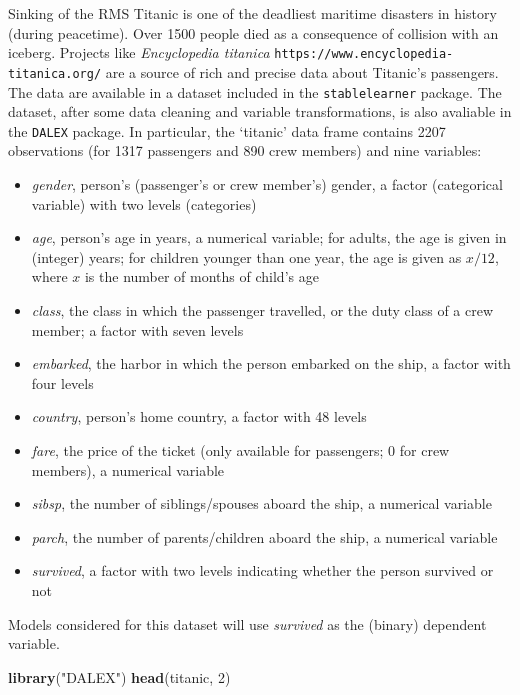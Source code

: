 \documentclass[12pt,]{krantz}
\newenvironment{Shaded}{\begin{snugshade}}{\end{snugshade}}
\newcommand{\DecValTok}[1]{\textcolor[rgb]{0.00,0.00,0.81}{#1}}
\newcommand{\KeywordTok}[1]{\textcolor[rgb]{0.13,0.29,0.53}{\textbf{#1}}}
\newcommand{\NormalTok}[1]{#1}
\newcommand{\StringTok}[1]{\textcolor[rgb]{0.31,0.60,0.02}{#1}}
\providecommand{\tightlist}{%
  \setlength{\itemsep}{0pt}\setlength{\parskip}{0pt}}
\theoremstyle{definition}
\theoremstyle{definition}
\theoremstyle{definition}
\theoremstyle{remark}
\begin{document}
Sinking of the RMS Titanic is one of the deadliest maritime disasters in
history (during peacetime). Over 1500 people died as a consequence of
collision with an iceberg. Projects like \emph{Encyclopedia titanica}
\texttt{https://www.encyclopedia-titanica.org/} are a source of rich and
precise data about Titanic's passengers. The data are available in a
dataset included in the \texttt{stablelearner} package. The dataset,
after some data cleaning and variable transformations, is also avaliable
in the \texttt{DALEX} package. In particular, the `titanic' data frame
contains 2207 observations (for 1317 passengers and 890 crew members)
and nine variables:

\begin{itemize}
\tightlist
\item
  \emph{gender}, person's (passenger's or crew member's) gender, a
  factor (categorical variable) with two levels (categories)
\item
  \emph{age}, person's age in years, a numerical variable; for adults,
  the age is given in (integer) years; for children younger than one
  year, the age is given as \(x/12\), where \(x\) is the number of
  months of child's age
\item
  \emph{class}, the class in which the passenger travelled, or the duty
  class of a crew member; a factor with seven levels
\item
  \emph{embarked}, the harbor in which the person embarked on the ship,
  a factor with four levels
\item
  \emph{country}, person's home country, a factor with 48 levels
\item
  \emph{fare}, the price of the ticket (only available for passengers; 0
  for crew members), a numerical variable
\item
  \emph{sibsp}, the number of siblings/spouses aboard the ship, a
  numerical variable
\item
  \emph{parch}, the number of parents/children aboard the ship, a
  numerical variable
\item
  \emph{survived}, a factor with two levels indicating whether the
  person survived or not
\end{itemize}

Models considered for this dataset will use \emph{survived} as the
(binary) dependent variable.

\begin{Shaded}
\begin{Highlighting}[]
\KeywordTok{library}\NormalTok{(}\StringTok{"DALEX"}\NormalTok{)}
\KeywordTok{head}\NormalTok{(titanic, }\DecValTok{2}\NormalTok{)}
\end{Highlighting}
\end{Shaded}
\end{document}
